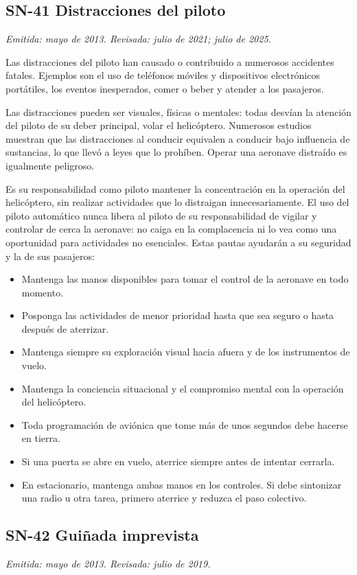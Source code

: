 \subsection*{SN-41 \quad Distracciones del piloto}
{\small\textit{Emitida: mayo de 2013. Revisada: julio de 2021; julio de 2025.}}

Las distracciones del piloto han causado o contribuido a numerosos accidentes fatales. Ejemplos son el uso de teléfonos móviles y dispositivos electrónicos portátiles, los eventos inesperados, comer o beber y atender a los pasajeros.

Las distracciones pueden ser visuales, físicas o mentales: todas desvían la atención del piloto de su deber principal, volar el helicóptero. Numerosos estudios muestran que las distracciones al conducir equivalen a conducir bajo influencia de sustancias, lo que llevó a leyes que lo prohíben. Operar una aeronave distraído es igualmente peligroso.

Es su responsabilidad como piloto mantener la concentración en la operación del helicóptero, sin realizar actividades que lo distraigan innecesariamente. El uso del piloto automático nunca libera al piloto de su responsabilidad de vigilar y controlar de cerca la aeronave: no caiga en la complacencia ni lo vea como una oportunidad para actividades no esenciales. Estas pautas ayudarán a su seguridad y la de sus pasajeros:

\begin{itemize}
\item Mantenga las manos disponibles para tomar el control de la aeronave en todo momento.
\item Posponga las actividades de menor prioridad hasta que sea seguro o hasta después de aterrizar.
\item Mantenga siempre su exploración visual hacia afuera y de los instrumentos de vuelo.
\item Mantenga la conciencia situacional y el compromiso mental con la operación del helicóptero.
\item Toda programación de aviónica que tome más de unos segundos debe hacerse en tierra.
\item Si una puerta se abre en vuelo, aterrice siempre antes de intentar cerrarla.
\item En estacionario, mantenga ambas manos en los controles. Si debe sintonizar una radio u otra tarea, primero aterrice y reduzca el paso colectivo.
\end{itemize}

\subsection*{SN-42 \quad Guiñada imprevista}
{\small\textit{Emitida: mayo de 2013. Revisada: julio de 2019.}}

